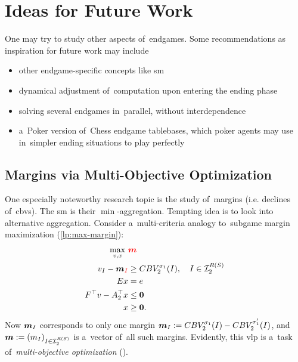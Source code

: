 \chapter{Ideas for Future Work}
\label{ch:future-work}
One may try to study other aspects of~endgames.
Some recommendations as inspiration for future work may include
\begin{itemize}
  \item other endgame-specific concepts like \acrlong{sm}
  \item dynamical adjustment of~computation upon entering the ending phase
  \item solving several endgames in~parallel, without interdependence
  \item a~Poker version of~Chess endgame tablebases, which poker agents may use in~simpler ending situations to play perfectly
\end{itemize}

\section{Margins via Multi-Objective Optimization}
One especially noteworthy research topic is the study of~margins (i.e. declines of~\acrshort{cbv}s).
The \acrlong{sm} is their $\min$-aggregation.
Tempting idea is to look into alternative aggregation.
Consider a~multi-criteria analogy to~subgame margin maximization (\ref{lp:max-margin}):
\begin{equation}
  \label{vlp:max-margins}
  \begin{split}
    \max_{v, x}\ &\textcolor{red}{\boldsymbol{m}} \\
    v_I - \boldsymbol{m}_{\textcolor{red}{I}} &\ge CBV_2^{\sigma_1}(I), \quad I \in \mathcal{I}_2^{R(S)}\\ 
    Ex &= e \\
    F^\top v - A_2^\top x &\le \boldsymbol{0} \\
    x &\ge \boldsymbol{0}.
  \end{split}
\end{equation}
Now $\boldsymbol{m}_I$ corresponds to only one margin $\boldsymbol{m}_I := CBV_2^{\sigma_1} (I) - CBV_2^{\sigma_1'} (I)$, and $\boldsymbol{m} := (m_I) _{I\in\mathcal{I}_2^{R(S)}}$ is a~vector of~all such margins.
Evidently, this \acrfull{vlp} is a~task of~\emph{multi-objective optimization} (\cite{Ehrgott2006multicriteria, Grygarova1996zaklady}).

